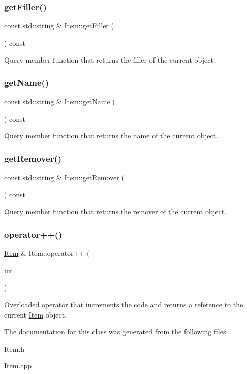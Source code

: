 \subsubsection{\texorpdfstring{get\+Filler()}{getFiller()}}
{\footnotesize\ttfamily const std\+::string \& Item\+::get\+Filler (\begin{DoxyParamCaption}{ }\end{DoxyParamCaption}) const}

Query member function that returns the filler of the current object. \mbox{\label{classItem_a906722df9ab3f424d32c4106ff64aa15}} 
\subsubsection{\texorpdfstring{get\+Name()}{getName()}}
{\footnotesize\ttfamily const std\+::string \& Item\+::get\+Name (\begin{DoxyParamCaption}{ }\end{DoxyParamCaption}) const}

Query member function that returns the name of the current object. \mbox{\label{classItem_a259c9f359ed2378aae4cbb5ea53bef18}} 
\subsubsection{\texorpdfstring{get\+Remover()}{getRemover()}}
{\footnotesize\ttfamily const std\+::string \& Item\+::get\+Remover (\begin{DoxyParamCaption}{ }\end{DoxyParamCaption}) const}

Query member function that returns the remover of the current object. \mbox{\label{classItem_a818f9273ed8889c8b27cb97d2c292e77}} 
\subsubsection{\texorpdfstring{operator++()}{operator++()}}
{\footnotesize\ttfamily \mbox{\hyperlink{classItem}{Item}} \& Item\+::operator++ (\begin{DoxyParamCaption}\item[{int}]{ }\end{DoxyParamCaption})}

Overloaded operator that increments the code and returns a reference to the current \mbox{\hyperlink{classItem}{Item}} object. 

The documentation for this class was generated from the following files\+:\begin{DoxyCompactItemize}
\item 
Item.\+h\item 
Item.\+cpp\end{DoxyCompactItemize}
